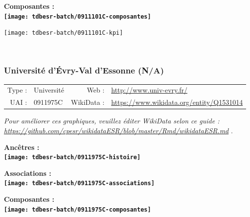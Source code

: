\documentclass[12pt,french,]{article}
\begin{document}
\hrulefill

\begin{center} \bf Composantes : \\  
\texttt{[image: tdbesr-batch/0911101C-composantes]} \end{center}

\begin{center}\texttt{[image: tdbesr-batch/0911101C-kpi]} \end{center}\checkoddpage

\ifoddpage \fi ~\newpage  

\hypertarget{universituxe9-duxe9vry-val-dessonne-na}{%
\subsubsection{Université d'Évry-Val d'Essonne
(N/A)}\label{universituxe9-duxe9vry-val-dessonne-na}}

\begin{tabular*}{\textwidth}{rp{5cm}rl}  
\hline  
Type : & Université & Web : &\href{http://www.univ-evry.fr/}{http://www.univ-evry.fr/} \\  
UAI : & 0911975C & WikiData : & \href{https://www.wikidata.org/entity/Q1531014}{https://www.wikidata.org/entity/Q1531014} \\  
\hline  
\end{tabular*}

\textit{\scriptsize Pour améliorer ces graphiques, veuillez éditer WikiData selon ce guide :  \href{https://github.com/cpesr/wikidataESR/blob/master/Rmd/wikidataESR.md}{https://github.com/cpesr/wikidataESR/blob/master/Rmd/wikidataESR.md}}
.

\vspace{1cm}  
\begin{minipage}[b]{0.50\textwidth}\begin{center} \bf Ancêtres : \\  
\texttt{[image: tdbesr-batch/0911975C-histoire]} \end{center}\end{minipage}\begin{minipage}[b]{0.50\textwidth}\begin{center} \bf Associations : \\  
\texttt{[image: tdbesr-batch/0911975C-associations]} \end{center}\end{minipage}

\hrulefill

\begin{center} \bf Composantes : \\  
\texttt{[image: tdbesr-batch/0911975C-composantes]} \end{center}
\end{document}
